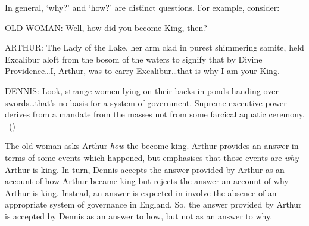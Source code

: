 \begin{note}
  In general, `why?' and `how?' are distinct questions.
  For example, consider:

  \begin{scenario}[England AD 932]
    \label{scen:king}
    \vspace{-\baselineskip}
    \begin{screenplay}
    \item[OLD WOMAN:]
      Well, how did you become King, then?
    \item[ARTHUR:]
      The Lady of the Lake, her arm clad in purest shimmering samite, held Excalibur aloft from the bosom of the waters to signify that by Divine Providence\space\dots\space I, Arthur, was to carry Excalibur\dots\space that is why I am your King.
    \item[DENNIS:]
      Look, strange women lying on their backs in ponds handing over swords\space\dots\space that's no basis for a system of government.
      Supreme executive power derives from a mandate from the masses not from some farcical aquatic ceremony.\newline
      \mbox{ }\hfill\mbox{(\cite[8--9]{Cleese:1974aa})}
    \end{screenplay}
    \vspace{-\baselineskip}
  \end{scenario}

  The old woman asks Arthur \emph{how} the become king.
  Arthur provides an answer in terms of some events which happened, but emphasises that those events are \emph{why} Arthur is king.
  In turn, Dennis accepts the answer provided by Arthur as an account of how Arthur became king but rejects the answer an account of why Arthur is king.
  Instead, an answer is expected in involve the absence of an appropriate system of governance in England.
  So, the answer provided by Arthur is accepted by Dennis as an answer to how, but not as an answer to why.
\end{note}

